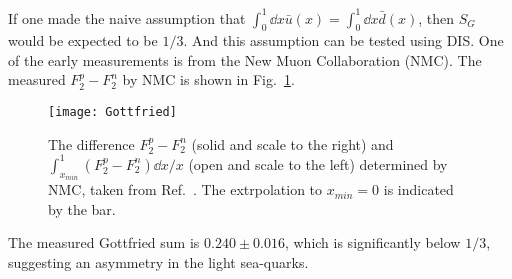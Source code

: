 \documentclass[../main.tex]{subfiles}
\begin{document}
If one made the naive assumption that $\int_0^1\dd{x} \bar{u}\left(x\right)=\int_0^1\dd{x} \bar{d}\left(x\right)$,
then $S_G$ would be expected to be $1/3$. And this assumption can be tested using DIS.
One of the early measurements is from the New Muon Collaboration (NMC)\cite{amaudruz1991}. 
The measured $F_2^p-F_2^n$ by NMC is shown in Fig.\ \ref{fig:NMC_Gottfried}. 
\begin{figure}[htbp!]
	\centering
	\texttt{[image: Gottfried]}
	\caption{The difference $F_2^p -F_2^n$ (solid and scale to the right) and 
		$\int_{x_{min}}^1 (F_2^p-F_2^n)\dd{x}/x$ (open and scale to the left) 
		determined by NMC, taken from Ref.\ \cite{amaudruz1991}. The extrpolation
		to $x_{min}=0$ is indicated by the bar.}
	\label{fig:NMC_Gottfried}
\end{figure}
The measured Gottfried sum is $0.240 \pm 0.016$, which is significantly below 
$1/3$, suggesting an asymmetry in the light sea-quarks.
\end{document}
